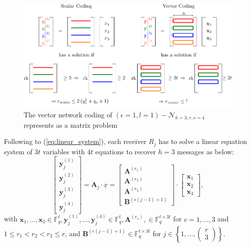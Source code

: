\begin{figure}[H]
\caption{The vector network coding of $(\epsilon=1,l=1)-\mathcal{N}_{h=3,r,s=4}$
represents as a matrix problem \label{fig:rk_h3}}

\centering{}\includegraphics[width=0.6\paperwidth]{../figures/rk_h3}
\end{figure}

Following to (\ref{eq:linear_system}), each receiver $R_{j}$ has
to solve a linear equation system of $3t$ variables with $4t$ equations
to recover $h=3$ messages as below:
\[
\left[\begin{array}{c}
\boldsymbol{y}_{j}^{\left(1\right)}\\
\boldsymbol{y}_{j}^{\left(2\right)}\\
\boldsymbol{y}_{j}^{\left(3\right)}\\
\boldsymbol{y}_{j}^{\left(4\right)}
\end{array}\right]=\boldsymbol{A}_{j}\cdot\underline{x}=\left[\begin{array}{c}
\boldsymbol{A}^{\left(r_{1}\right)}\\
\boldsymbol{A}^{\left(r_{2}\right)}\\
\boldsymbol{A}^{\left(r_{3}\right)}\\
\boldsymbol{B}^{\left(\epsilon\left(j-1\right)+1\right)}
\end{array}\right]\cdot\left[\begin{array}{c}
\boldsymbol{x}_{1}\\
\boldsymbol{x}_{2}\\
\boldsymbol{x}_{3}
\end{array}\right],
\]
with $\boldsymbol{x}_{1},\ldots,\boldsymbol{x}_{3}\in\ensuremath{\mathbb{F}}_{q}^{t},\boldsymbol{y}_{j}^{\left(1\right)},\ldots,\boldsymbol{y}_{j}^{\left(4\right)}\in\ensuremath{\mathbb{F}}_{q}^{t},\boldsymbol{A}^{\left(r_{v}\right)},\in\ensuremath{\mathbb{F}}_{q}^{t\times3t}$
for $v=1,\ldots,3$ and $1\leq r_{1}<r_{2}<r_{3}\leq r$, and $\boldsymbol{B}^{\left(\epsilon\left(j-1\right)+1\right)}\in\ensuremath{\mathbb{F}}_{q}^{t\times3t}$
for $j\in\left\{ 1,\ldots,\left(\begin{array}{c}
r\\
3
\end{array}\right)\right\} $.

